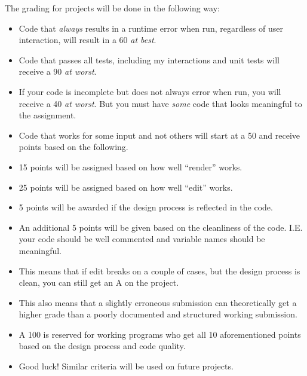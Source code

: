 \documentclass{article}
\begin{document}
The grading for projects will be done in the following way:
\begin{itemize}
\item Code that \emph{always} results in a runtime error when run, regardless of
  user interaction, will result in a 60 \emph{at best}. 
\item Code that passes all tests, including my interactions and unit tests will
  receive a 90 \emph{at worst}.
\item If your code is incomplete but does not always error when run, you will receive a 40 \emph{at worst}. But you must have \emph{some} code that looks meaningful to the assignment.
\item Code that works for some input and not others will start at a 50 and
  receive points based on the following.
\item 15 points will be assigned based on how well ``render'' works.
\item 25 points will be assigned based on how well ``edit'' works.
\item 5 points will be awarded if the design process is reflected in the code.
\item An additional 5 points will be given based on the cleanliness of the code. I.E. your code should be well commented and variable names should be meaningful.
\item This means that if edit breaks on a couple of cases, but the design process
  is clean, you can still get an A on the project.
\item This also means that a slightly erroneous submission can theoretically get a higher grade than a poorly documented and structured working submission.
\item A 100 is reserved for working programs who get all  10  aforementioned points based on the design  process and code quality.
\item Good luck! Similar criteria will be used on future projects.
\end{itemize}
\end{document}
